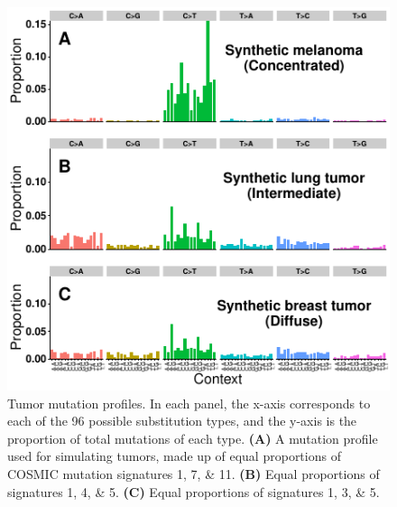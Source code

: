 \documentclass[a4,center,fleqn]{NAR}
\begin{document}
\begin{figure}
  \begin{center}
  \includegraphics{figures/sim_signatures_only.pdf}
  \end{center}
  \caption{Tumor mutation profiles.
  In each panel, the x-axis corresponds to each of the 96 possible substitution types, and the y-axis is the proportion of total mutations of each type.
  \textbf{(A)} A mutation profile used for simulating tumors, made up of equal proportions of COSMIC mutation signatures 1, 7, \& 11.
  \textbf{(B)} Equal proportions of signatures 1, 4, \& 5.
  \textbf{(C)} Equal proportions of signatures 1, 3, \& 5.
   }
  \label{NAR-simsigfig}
 \end{figure}
\end{document}

